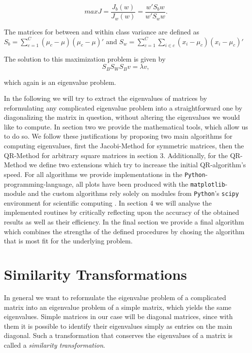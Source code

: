 \documentclass[12pt]{article}
\begin{document}
\begin{equation}
\label{LDA}
max J = \frac{J_b(w)}{J_w(w)} = \frac{w \prime S_{b} w}{w \prime S_{w} w}.
\end{equation}

The matrices for between and within class variance are defined as $S_b = \sum_{c=1}^{C}(\mu_c - \mu)(\mu_c - \mu)\prime$ and $S_w = \sum_{c=1}^{C}\sum_{i \in c}(x_i - \mu_c)(x_i - \mu_c)\prime$

The solution to this maximization problem is given by
\begin{equation}
S_B S_W S_B v = \lambda v,
\end{equation}

which again is an eigenvalue problem.

In the following we will try to extract the eigenvalues of matrices by reformulating any complicated eigenvalue problem into a straightforward one by diagonalizing the matrix in question, without altering the eigenvalues we would like to compute. In section two we provide the mathematical tools, which allow us to do so. We follow these justifications by proposing two main algorithms for computing eigenvalues, first the Jacobi-Method for symmetric matrices, then the QR-Method for arbitrary square matrices in section 3. Additionally, for the QR-Method we define two extensions which try to increase the initial QR-algorithm's speed.
For all algorithms we provide implementations in the \texttt{Python}-programming-language, all plots have been produced with the \texttt{matplotlib}-module and the custom algorithms rely solely on modules from \texttt{Python}'s \texttt{scipy} environment for scientific computing \cite{python, matplotlib, scipy}. In section 4 we will analyse the implemented routines by critically reflecting upon the accuracy of the obtained results as well as their efficiency. In the final section we provide a final algorithm which combines the strengths of the defined procedures by chosing the algorithm that is most fit for the underlying problem.
\section{Similarity Transformations}

In general we want to reformulate the eigenvalue problem of a complicated matrix into an eigenvalue problem of a simple matrix, which yields the same eigenvalues. Simple matrices in our case will be diagonal matrices, since with them it is possible to identify their eigenvalues simply as entries on the main diagonal. Such a transformation that conserves the eigenvalues of a matrix is called a \textit{similarity transformation}. 
\end{document}
